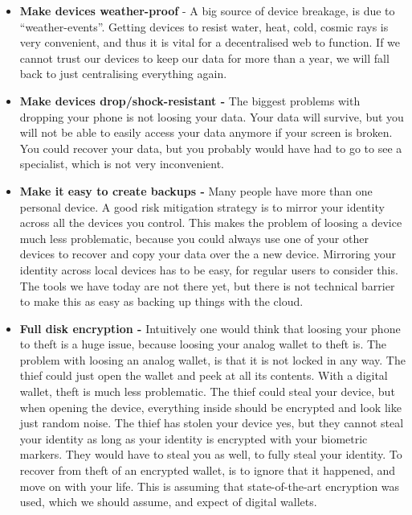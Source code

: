\begin{itemize}
\tightlist
\item
  \textbf{Make devices weather-proof} - A big source of device breakage,
  is due to ``weather-events''. Getting devices to resist water, heat,
  cold, cosmic rays is very convenient, and thus it is vital for a
  decentralised web to function. If we cannot trust our devices to keep
  our data for more than a year, we will fall back to just centralising
  everything again.
\item
  \textbf{Make devices drop/shock-resistant -} The biggest problems with
  dropping your phone is not loosing your data. Your data will survive,
  but you will not be able to easily access your data anymore if your
  screen is broken. You could recover your data, but you probably would
  have had to go to see a specialist, which is not very inconvenient.
\item
  \textbf{Make it easy to create backups -} Many people have more than
  one personal device. A good risk mitigation strategy is to mirror your
  identity across all the devices you control. This makes the problem of
  loosing a device much less problematic, because you could always use
  one of your other devices to recover and copy your data over the a new
  device. Mirroring your identity across local devices has to be easy,
  for regular users to consider this. The tools we have today are not
  there yet, but there is not technical barrier to make this as easy as
  backing up things with the cloud.
\item
  \textbf{Full disk encryption -} Intuitively one would think that
  loosing your phone to theft is a huge issue, because loosing your
  analog wallet to theft is. The problem with loosing an analog wallet,
  is that it is not locked in any way. The thief could just open the
  wallet and peek at all its contents. With a digital wallet, theft is
  much less problematic. The thief could steal your device, but when
  opening the device, everything inside should be encrypted and look
  like just random noise. The thief has stolen your device yes, but they
  cannot steal your identity as long as your identity is encrypted with
  your biometric markers. They would have to steal you as well, to fully
  steal your identity. To recover from theft of an encrypted wallet, is
  to ignore that it happened, and move on with your life. This is
  assuming that state-of-the-art encryption was used, which we should
  assume, and expect of digital wallets.
\end{itemize}

